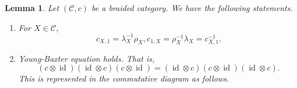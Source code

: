\documentclass{article}
\newtheorem{lemma}{Lemma}[section]
\numberwithin{equation}{theorem}
\DeclareMathOperator{\id}{id}
\newcommand{\cat}[0]{\mathscr{C}}
\begin{document}
\begin{lemma}
    Let $(\cat,c)$ be a braided category. We have the following statements.
    \begin{enumerate}[1).]
        \item For $X\in\cat$, 
        \begin{equation*}
            c_{X,1}=\lambda_X^{-1}\rho_X,c_{1,X}=\rho_{X}^{-1}\lambda_X = c_{X,1}^{-1}.
        \end{equation*}
        \item Young-Baxter equation holds. That is,\begin{equation*}
            (c\otimes\id)(\id\otimes c)(c\otimes\id) = (\id\otimes c)(c\otimes\id)(\id\otimes c).
        \end{equation*}
        This is represented in the commutative diagram as follows.
        \begin{center}
        \end{center}
    \end{enumerate}
\end{lemma}
\end{document}
